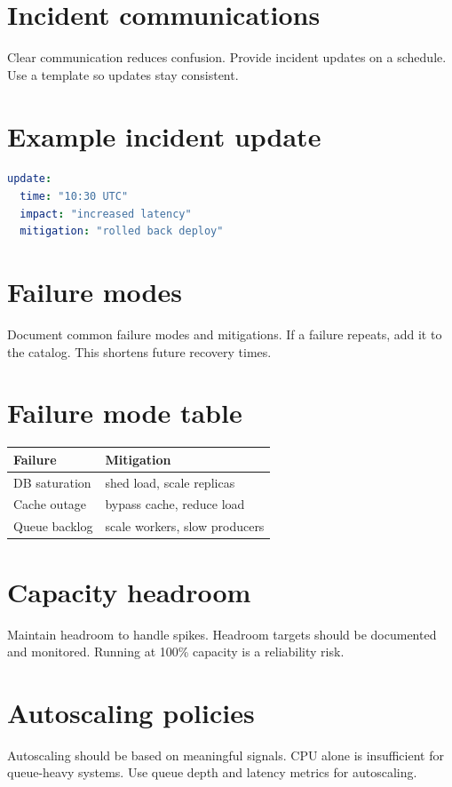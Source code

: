 \section{Incident communications}
Clear communication reduces confusion.
Provide incident updates on a schedule.
Use a template so updates stay consistent.

\section{Example incident update}
\begin{lstlisting}[language=YAML]
update:
  time: "10:30 UTC"
  impact: "increased latency"
  mitigation: "rolled back deploy"
\end{lstlisting}

\section{Failure modes}
Document common failure modes and mitigations.
If a failure repeats, add it to the catalog.
This shortens future recovery times.

\section{Failure mode table}
\begin{tabularx}{\textwidth}{@{}lX@{}}
\toprule
Failure & Mitigation \\
\midrule
DB saturation & shed load, scale replicas \\
Cache outage & bypass cache, reduce load \\
Queue backlog & scale workers, slow producers \\
\bottomrule
\end{tabularx}

\section{Capacity headroom}
Maintain headroom to handle spikes.
Headroom targets should be documented and monitored.
Running at 100\% capacity is a reliability risk.

\section{Autoscaling policies}
Autoscaling should be based on meaningful signals.
CPU alone is insufficient for queue-heavy systems.
Use queue depth and latency metrics for autoscaling.


